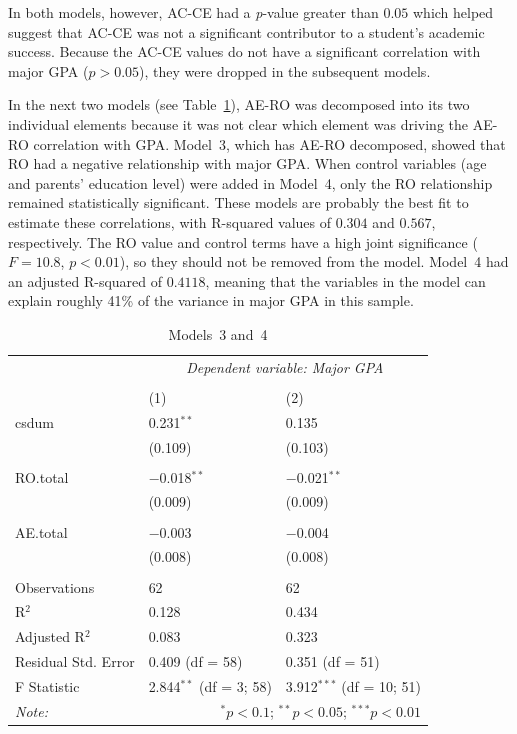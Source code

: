 In both models, however, AC-CE had a \textit{p}-value greater than $0.05$ which helped suggest that AC-CE was not a significant contributor to a student's academic success. Because the AC-CE values do not have a significant correlation with major GPA ($p>0.05$), they were dropped in the subsequent models.

In the next two models (see Table~\ref{tab:models34}), AE-RO was decomposed into its two individual elements because it was not clear which element was driving the AE-RO correlation with GPA. Model~3, which has AE-RO decomposed, showed that RO had a negative relationship with major GPA. When control variables (age and parents' education level) were added in Model~4, only the RO relationship remained statistically significant. These models are probably the best fit to estimate these correlations, with R-squared values of $0.304$ and $0.567$, respectively. The RO value and control terms have a high joint significance ($F=10.8$, $p<0.01$), so they should not be removed from the model. Model~4 had an adjusted R-squared of $0.4118$, meaning that the variables in the model can explain roughly 41\% of the variance in major GPA in this sample.

\begin{table}[!htbp] \centering
  \centering
  \caption{Models~3 and~4}
  \label{tab:models34}
  \begin{tabular}{@{\extracolsep{5pt}}lll}
    \toprule
     & \multicolumn{2}{c}{\textit{Dependent variable: Major GPA}} \\
    \cmidrule{2-3}
    \\[-1.8ex] & (1) & (2)\\
    \midrule
    csdum & 0.231$^{**}$ & 0.135 \\
      & (0.109) & (0.103) \\
      & & \\
    RO.total & $-$0.018$^{**}$ & $-$0.021$^{**}$ \\
      & (0.009) & (0.009) \\
      & & \\
    AE.total & $-$0.003 & $-$0.004 \\
      & (0.008) & (0.008) \\
      & & \\
    \midrule
    Observations & 62 & 62 \\
    R$^{2}$ & 0.128 & 0.434 \\
    Adjusted R$^{2}$ & 0.083 & 0.323 \\
    Residual Std. Error & 0.409 (df = 58) & 0.351 (df = 51) \\
    F Statistic & 2.844$^{**}$ (df = 3; 58) & 3.912$^{***}$ (df = 10; 51) \\
    \bottomrule
    \textit{Note:}  & \multicolumn{2}{r}{$^{*}p<0.1$; $^{**}p<0.05$; $^{***}p<0.01$} \\
  \end{tabular}
\end{table}


